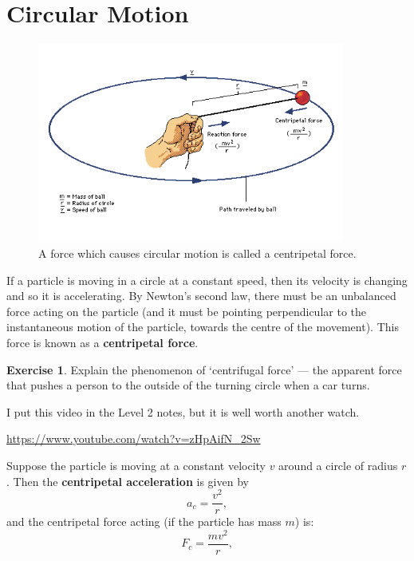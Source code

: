 \documentclass[a4paper]{amsbook}
\newcommand{\goandwatch}[1]{
\begin{center}
\begin{tcolorbox}[width=0.8\textwidth,colback={SkyBlue!20},title={\textbf{Go and watch...}},colbacktitle=MidnightBlue,coltitle=White]
  \textcolor{MidnightBlue}{\url{#1}}
\end{tcolorbox}
\end{center}}
\theoremstyle{definition}
\newtheorem{exercise}{Exercise}
\numberwithin{exercise}{chapter}
\numberwithin{exercise}{chapter}
\newcommand\capcite[1]{}
\begin{document}
\section{Circular Motion}
\begin{figure}
  \centering
  \includegraphics[width=0.9\textwidth]{centripetal}
  \caption{A force which causes circular motion is called a centripetal force. \capcite{https://i.pinimg.com/originals/74/d2/28/74d228e85a6a3f4fb700bcafa677539d.gif}\label{fig:centripetal}}
\end{figure}
If a particle is moving in a circle at a constant speed, then its velocity is changing and so it is accelerating. By
Newton's second law, there must be an unbalanced force acting on the particle (and it must be pointing perpendicular to
the instantaneous motion of the particle, towards the centre of the movement). This force is known as a \textbf{centripetal force}.

\begin{exercise}
  Explain the phenomenon of `centrifugal force' --- the apparent force that pushes a person to the outside of the
  turning circle when a car turns.
\end{exercise}

I put this video in the Level 2 notes, but it is well worth another watch.
\goandwatch{https://www.youtube.com/watch?v=zHpAifN_2Sw}

Suppose the particle is moving at a constant velocity $ v $ around a circle of radius $ r $. Then the \textbf{centripetal
acceleration} is given by
\begin{equation}
  a_c = \frac{v^2}{r},
\end{equation}
and the centripetal force acting (if the particle has mass $ m $) is:
\begin{equation}
  F_c = \frac{mv^2}{r},
\end{equation}
\end{document}
